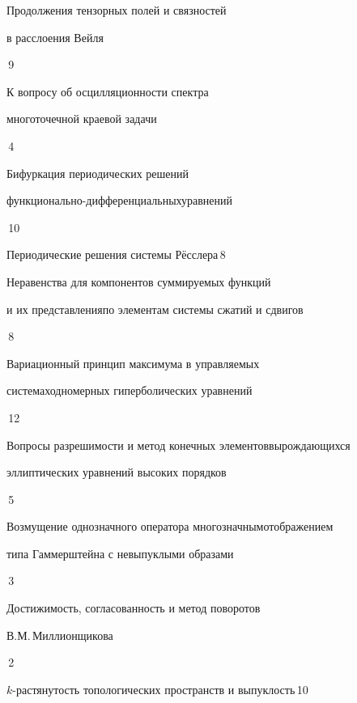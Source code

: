 

{Продолжения тензорных полей и связностей 


в расслоения Вейля}{\No\,9}




{К вопросу об осцилляционности спектра


многоточечной краевой задачи}{\No\,4}




{Бифуркация периодических решений 


функционально-дифференциальных\newline уравнений}{\No\,10}




{Периодические решения системы Р\"е{}сслера}{\No\,8}




{Неравенства для компонентов суммируемых функций


и их представления\newline по элементам системы сжатий и сдвигов}{\No\,8}




{Вариационный принцип максимума в управляемых


системах\newline одномерных гиперболических уравнений}{\No\,12}




{Вопросы разрешимости и метод конечных элементов\newline вырождающихся


эллиптических уравнений высоких порядков}{\No\,5}




{Возмущение однозначного оператора многозначным\newline отображением


типа Гаммерштейна с невыпуклыми образами}{\No\,3}




{Достижимость, согласованность и метод поворотов\newline


В.М.\,Миллионщикова}{\No\,2}




{$k$-растянутость топологических пространств и выпуклость}{\No\,10}




